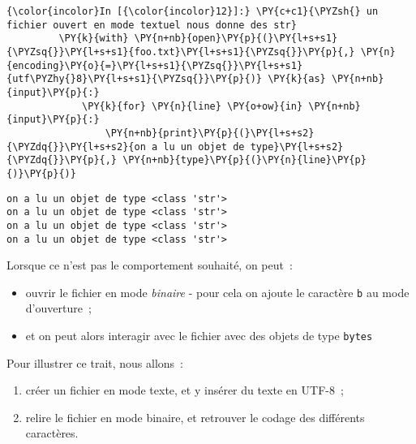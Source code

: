     \begin{Verbatim}[commandchars=\\\{\}]
{\color{incolor}In [{\color{incolor}12}]:} \PY{c+c1}{\PYZsh{} un fichier ouvert en mode textuel nous donne des str}
         \PY{k}{with} \PY{n+nb}{open}\PY{p}{(}\PY{l+s+s1}{\PYZsq{}}\PY{l+s+s1}{foo.txt}\PY{l+s+s1}{\PYZsq{}}\PY{p}{,} \PY{n}{encoding}\PY{o}{=}\PY{l+s+s1}{\PYZsq{}}\PY{l+s+s1}{utf\PYZhy{}8}\PY{l+s+s1}{\PYZsq{}}\PY{p}{)} \PY{k}{as} \PY{n+nb}{input}\PY{p}{:}
             \PY{k}{for} \PY{n}{line} \PY{o+ow}{in} \PY{n+nb}{input}\PY{p}{:}
                 \PY{n+nb}{print}\PY{p}{(}\PY{l+s+s2}{\PYZdq{}}\PY{l+s+s2}{on a lu un objet de type}\PY{l+s+s2}{\PYZdq{}}\PY{p}{,} \PY{n+nb}{type}\PY{p}{(}\PY{n}{line}\PY{p}{)}\PY{p}{)}
\end{Verbatim}


    \begin{Verbatim}[commandchars=\\\{\}]
on a lu un objet de type <class 'str'>
on a lu un objet de type <class 'str'>
on a lu un objet de type <class 'str'>
on a lu un objet de type <class 'str'>

    \end{Verbatim}

    Lorsque ce n'est pas le comportement souhaité, on peut~:
    
\begin{itemize}
	\item 
	ouvrir le fichier en mode \emph{binaire} - pour cela on ajoute le caractère
	\texttt{b} au mode d'ouverture~;
	\item
	et on peut alors interagir avec le fichier avec des objets de type \texttt{bytes}
\end{itemize}

    Pour illustrer ce trait, nous allons~:

\begin{enumerate}
	\item 
	créer un fichier en mode texte, et y insérer du texte en UTF-8~;
	\item
	relire le fichier en mode
	binaire, et retrouver le codage des différents caractères.
\end{enumerate}

